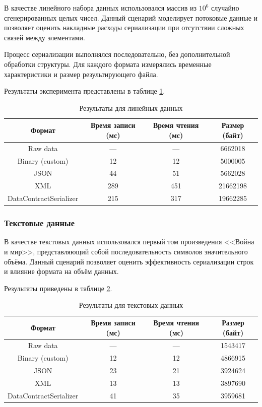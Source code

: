 \documentclass[coursework]{SCWorks}
\begin{document}
В качестве линейного набора данных использовался массив из $10^6$ случайно сгенерированных целых чисел. Данный сценарий моделирует потоковые данные и позволяет оценить накладные расходы сериализации при отсутствии сложных связей между элементами.

Процесс сериализации выполнялся последовательно, без дополнительной обработки структуры. Для каждого формата измерялись временные характеристики и размер результирующего файла.

Результаты эксперимента представлены в таблице \ref{tab:linear_results}.

\begin{table}[h]
\centering
\caption{Результаты для линейных данных}
\label{tab:linear_results}
\begin{tabular}{|c|c|c|c|}
\hline
Формат & Время записи (мс) & Время чтения (мс) & Размер (байт) \\ \hline
Raw data & --- & --- & 6662018  \\ \hline
Binary (custom) & 12 & 12 & 5000005 \\ \hline
JSON & 44 & 51 & 5662028  \\ \hline
XML & 289 & 451 & 21662198  \\ \hline
DataContractSerializer & 215 & 317 & 19662285  \\ \hline
\end{tabular}
\end{table}
\FloatBarrier

\subsubsection{Текстовые данные}

В качестве текстовых данных использовался первый том произведения <<Война и мир>>, представляющий собой последовательность символов значительного объёма. Данный сценарий позволяет оценить эффективность сериализации строк и влияние формата на объём данных.

Результаты приведены в таблице \ref{tab:text_results}.

\begin{table}[h]
\centering
\caption{Результаты для текстовых данных}
\label{tab:text_results}
\begin{tabular}{|c|c|c|c|}
\hline
Формат & Время записи (мс) & Время чтения (мс) & Размер (байт) \\ \hline
Raw data & --- & --- & 1543417 \\ \hline
Binary (custom) & 12 & 12 & 4866915 \\ \hline
JSON & 23 & 21 & 3924624 \\ \hline
XML & 13 & 13 & 3897690 \\ \hline
DataContractSerializer & 41 & 35 & 3959681 \\ \hline
\end{tabular}
\end{table}
\end{document}
